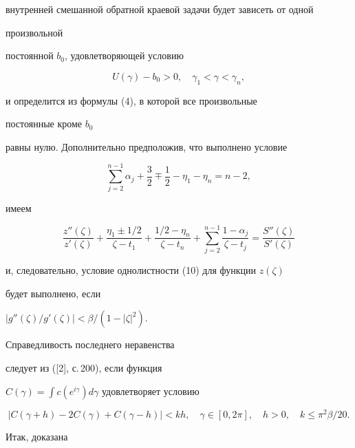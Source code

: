 внутренней смешанной обратной краевой задачи будет зависеть от одной 


произвольной


постоянной $b_0$, удовлетворяющей условию


\begin{equation}


U(\gamma)-b_0>0,\quad \gamma_1<\gamma<\gamma_n,


\end{equation}


и определится из формулы (4), в которой все произвольные 


постоянные кроме $b_0$


равны нулю. Дополнительно предположив, что выполнено условие


\begin{equation}


\sum_{j=2}^{n-1}\alpha_j+\frac{3}{2}\mp\frac{1}{2}-\eta_1-\eta_n=n-2,


\end{equation}


имеем


$$


\frac{z''(\zeta)}{z'(\zeta)}+\frac{\eta_1\pm1/2}{\zeta-t_1}+


\frac{1/2-\eta_n}{\zeta-t_n}+


\sum_{j=2}^{n-1}\frac{1-\alpha_j}{\zeta-t_j}= \frac{S''(\zeta)}{S'(\zeta)}


$$


и, следовательно, условие однолистности (10) для функции $z(\zeta)$ 


будет выполнено, если \linebreak


$|g''(\zeta)/g'(\zeta)|<\beta/(1-|\zeta|^2)$. 


Справедливость последнего неравенства


следует из ([2], с.\,200), если функция


$C(\gamma)=\int c(e^{i\gamma})d\gamma$ удовлетворяет условию


\begin{equation}


|C(\gamma+h) - 2C(\gamma) + C(\gamma-h)| < kh,\quad


\gamma\in [0,2\pi],\quad h > 0,\quad k \le \pi^{2}\beta/20.


\end{equation}





Итак, доказана





